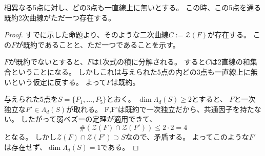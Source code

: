 \documentclass[a4]{article}
\begin{document}
        \begin{Prop}
            相異なる5点に対し、どの3点も一直線上に無いとする。
            この時、この5点を通る既約2次曲線がただ一つ存在する。
        \end{Prop}
        \begin{proof}
            すでに示した命題より、そのような二次曲線$C:=\mathcal{Z}(F)$が存在する。
            この$F$が既約であることと、ただ一つであることを示す。

            $F$が既約でないとすると、$F$は1次式の積に分解される。
            すると$C$は2直線の和集合ということになる。
            しかしこれは与えられた5点の内どの3点も一直線上に無いという仮定に反する。
            よって$F$は既約。

            与えられた5点を$S=\{P_1, \dots, P_5\}$とおく。
            $\dim \Lambda_d (S) \geq 2$とすると、
            $F$と一次独立な$F' \in \Lambda_d (S)$が取れる。
            F,F'は既約で一次独立だから、共通因子を持たない。
            したがって弱ベズーの定理が適用できて、
            \[ \# (\mathcal{Z}(F) \cap \mathcal{Z}(F')) \leq 2 \cdot 2=4 \]
            となる。
            しかし$\mathcal{Z}(F) \cap \mathcal{Z}(F') \supset S$なので、矛盾する。
            よってこのような$F'$は存在せず、$\dim \Lambda_d (S) =1$である。
            
        \end{proof}
\end{document}
